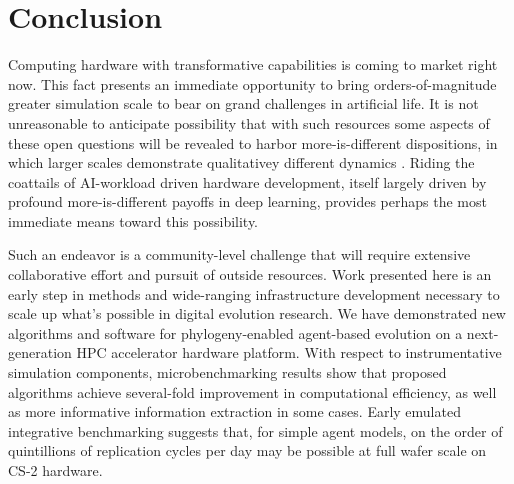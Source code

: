 \section{Conclusion} \label{sec:conclusion}

Computing hardware with transformative capabilities is coming to market right now.
This fact presents an immediate opportunity to bring orders-of-magnitude greater simulation scale to bear on grand challenges in artificial life.
It is not unreasonable to anticipate possibility that with such resources some aspects of these open questions will be revealed to harbor more-is-different dispositions, in which larger scales demonstrate qualitativey different dynamics \citep{anderson1972more}.
Riding the coattails of AI-workload driven hardware development, itself largely driven by profound more-is-different payoffs in deep learning, provides perhaps the most immediate means toward this possibility.

Such an endeavor is a community-level challenge that will require extensive collaborative effort and pursuit of outside resources.
Work presented here is an early step in methods and wide-ranging infrastructure development necessary to scale up what's possible in digital evolution research.
We have demonstrated new algorithms and software for phylogeny-enabled agent-based evolution on a next-generation HPC accelerator hardware platform.
With respect to instrumentative simulation components, microbenchmarking results show that proposed algorithms achieve several-fold improvement in computational efficiency, as well as more informative information extraction in some cases.
Early emulated integrative benchmarking suggests that, for simple agent models, on the order of quintillions of replication cycles per day may be possible at full wafer scale on CS-2 hardware.

